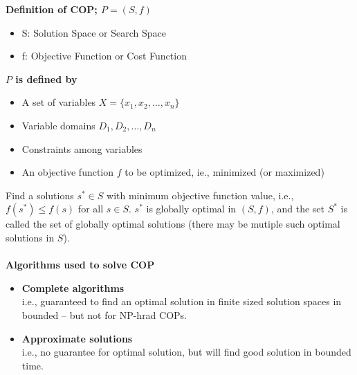 \documentclass[12pt,a4paper]{report}
\author{Frederik Appel Vardinghus-Nielsen}
\begin{document}
\noindent\textbf{Definition of COP; $P=(S,f)$}
\begin{itemize}
\item S: Solution Space or Search Space
\item f: Objective Function or Cost Function
\end{itemize}
\textbf{$P$ is defined by}
\begin{itemize}
\item A set of variables $X=\{x_1,x_2,\ldots,x_n\}$
\item Variable domains $D_1,D_2,\ldots,D_n$
\item Constraints among variables
\item An objective function $f$ to be optimized, ie., minimized (or maximized)
\end{itemize}
Find a solutions $s^*\in S$ with minimum objective function value, i.e., $f(s^*)\leq f(s)$ for all $s\in S$. $s^*$ is globally optimal in $(S,f)$, and the set $S^*$ is called the set of globally optimal solutions (there may be mutiple such optimal solutions in $S$).\\\\
\textbf{Algorithms used to solve COP}
\begin{itemize}
\item \textbf{Complete algorithms}\\
i.e., guaranteed to find an optimal solution in finite sized solution spaces in bounded -- but not for NP-hrad COPs.
\item \textbf{Approximate solutions}\\
i.e., no guarantee for optimal solution, but will find good solution in bounded time.
\end{itemize}
\end{document}
